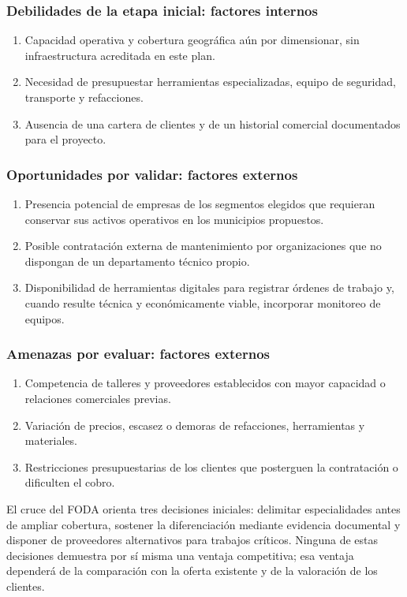 {\subsubsection{Debilidades de la etapa inicial: factores internos}
\begin{enumerate}
\item Capacidad operativa y cobertura geográfica aún por dimensionar, sin infraestructura acreditada en este plan.
\item Necesidad de presupuestar herramientas especializadas, equipo de seguridad, transporte y refacciones.
\item Ausencia de una cartera de clientes y de un historial comercial documentados para el proyecto.
\end{enumerate}

\subsubsection{Oportunidades por validar: factores externos}
\begin{enumerate}
\item Presencia potencial de empresas de los segmentos elegidos que requieran conservar sus activos operativos en los municipios propuestos.
\item Posible contratación externa de mantenimiento por organizaciones que no dispongan de un departamento técnico propio.
\item Disponibilidad de herramientas digitales para registrar órdenes de trabajo y, cuando resulte técnica y económicamente viable, incorporar monitoreo de equipos.
\end{enumerate}

\subsubsection{Amenazas por evaluar: factores externos}
\begin{enumerate}
\item Competencia de talleres y proveedores establecidos con mayor capacidad o relaciones comerciales previas.
\item Variación de precios, escasez o demoras de refacciones, herramientas y materiales.
\item Restricciones presupuestarias de los clientes que posterguen la contratación o dificulten el cobro.
\end{enumerate}

El cruce del FODA orienta tres decisiones iniciales: delimitar especialidades antes de ampliar cobertura, sostener la diferenciación mediante evidencia documental y disponer de proveedores alternativos para trabajos críticos. Ninguna de estas decisiones demuestra por sí misma una ventaja competitiva; esa ventaja dependerá de la comparación con la oferta existente y de la valoración de los clientes.

}
